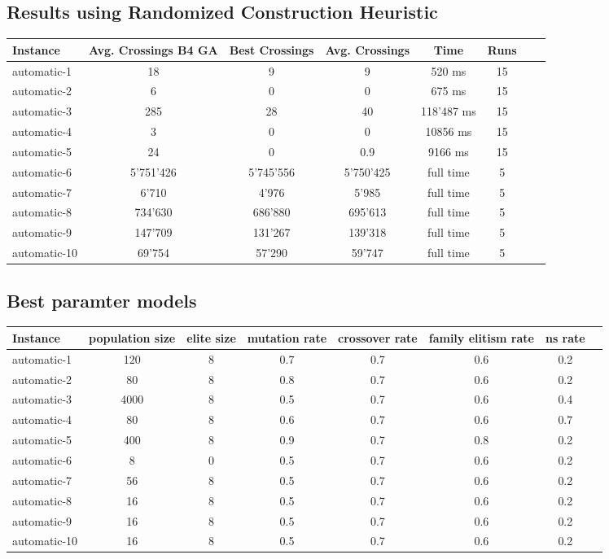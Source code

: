\documentclass[11pt]{article}
\begin{document}
\subsection{Results using Randomized Construction Heuristic}

\begin{tabular}{l*{6}{c}r}
	Instance & Avg. Crossings B4 GA & Best Crossings & Avg. Crossings & Time & Runs \\
	\hline
	automatic-1 & 18 & 9 & 9 & 520 ms & 15 \\
	automatic-2 & 6 & 0 & 0 & 675 ms & 15 \\
	automatic-3 & 285 & 28 & 40 & 118'487 ms & 15 \\
	automatic-4 & 3 & 0 & 0 & 10856 ms & 15 \\
	automatic-5 & 24 & 0 & 0.9 & 9166 ms & 15 \\
	automatic-6 & 5'751'426 & 5'745'556 & 5'750'425 & full time & 5 \\
	automatic-7 & 6'710 & 4'976 & 5'985 & full time & 5 \\
	automatic-8 & 734'630 & 686'880 & 695'613 & full time & 5  \\
	automatic-9 & 147'709 & 131'267 & 139'318 & full time & 5 \\
	automatic-10 & 69'754 & 57'290 & 59'747 & full time & 5  \\
\end{tabular}

\subsection{Best paramter models}

\begin{tabular}{l*{6}{c}r}
	Instance & population size & elite size & mutation rate & crossover rate & family elitism rate & ns rate \\
	\hline
	automatic-1 & 120 & 8 & 0.7 & 0.7 & 0.6 & 0.2 \\
	automatic-2 & 80 & 8 & 0.8 & 0.7 & 0.6 & 0.2 \\
	automatic-3 & 4000 & 8 & 0.5 & 0.7 & 0.6 & 0.4 \\
	automatic-4 & 80 & 8 & 0.6 & 0.7 & 0.6 & 0.7 \\
	automatic-5 & 400 & 8 & 0.9 & 0.7 & 0.8 & 0.2 \\
	automatic-6 & 8 & 0 & 0.5 & 0.7 & 0.6 & 0.2 \\
	automatic-7 & 56 & 8 & 0.5 & 0.7 & 0.6 & 0.2 \\
	automatic-8 & 16 & 8 & 0.5 & 0.7 & 0.6 & 0.2 \\
	automatic-9 & 16 & 8 & 0.5 & 0.7 & 0.6 & 0.2 \\
	automatic-10 & 16 & 8 & 0.5 & 0.7 & 0.6 & 0.2 \\
\end{tabular}
\end{document}
